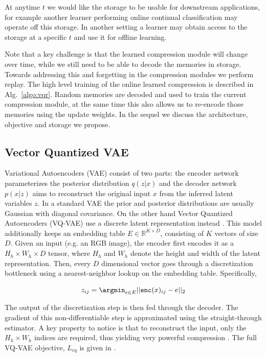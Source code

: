 \documentclass[colorinlistoftodos]{article} %
\begin{document}
At anytime $t$ we would like the storage to be usable for downstream applications, for example another learner performing online continual classification may operate off this storage. In another setting a learner may obtain access to the storage at a specific $t$ and use it for offline learning.

Note that a key challenge is that the learned compression module will change over time, while we still need to be able to decode the memories in storage. Towards addressing this and forgetting in the compression modules we perform replay. The high level training of the online learned compression is described in Alg.~\ref{algo:vqr}. Random memories are decoded and used to train the current compression module, at the same time this also allows us to re-encode those memories using the update weights. In the sequel we discuss the architecture, objective and storage we propose. 

\subsection{Vector Quantized VAE}
Variational Autoencoders (VAE) \citep{kingma2013auto} consist of two parts: the encoder network parameterizes the posterior distribution $q(z|x)$ and the decoder network $p(x|z)$ aims to reconstruct the original input $x$ from the inferred latent variables $z$. In a standard VAE the prior and posterior distributions are usually Gaussian with diagonal covariance. On the other hand Vector Quantized Autoencoders (VQ-VAE) use a discrete latent representation instead \citep{van2017neural}. This model additionally keeps an embedding table $E \in \mathbb{R}^{K \times D}$, consisting of $K$ vectors of size $D$. Given an input (e.g. an RGB image), the encoder first encodes it as a $H_h \times W_h \times D$ tensor, where $H_h$ and $W_h$ denote the height and width of the latent representation. Then, every $D$ dimensional vector goes through a discretization bottleneck using a nearest-neighbor lookup on the embedding table. Specifically, 

\begin{equation*}
    z_{ij} = \argmin_{e \in E} || \texttt{enc}(x)_{ij} - e ||_2
\end{equation*} 

The output of the discretization step is then fed through the decoder. The gradient of this  non-differentiable step is approximated using the straight-through estimator. A key property to notice is that to reconstruct the input, only the $H_h \times W_h$ indices are required, thus yielding very powerful compression \cite{van2017neural}. The full VQ-VAE objective, $L_{vq}$ is given in \citet{van2017neural}.
\end{document}
